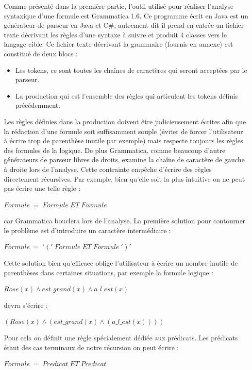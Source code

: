 Comme présenté dans la première partie, l'outil utilisé pour réaliser l'analyse syntaxique d'une formule est Grammatica 1.6. Ce programme écrit en Java est un générateur de parseur en Java et C\#, autrement dit il prend en entrée un fichier texte décrivant les règles d'une syntaxe à suivre et produit 4 classes vers le langage cible.
Ce fichier texte décrivant la grammaire (fournis en annexe) est constitué de deux blocs :
\begin{itemize}
	\item Les tokens, ce sont toutes les chaînes de caractères qui seront acceptées par le parseur.
	\item La production qui est l'ensemble des règles qui articulent les tokens définis précédemment.
\end{itemize}
Les règles définies dans la production doivent être judicieusement écrites afin que la rédaction d'une formule soit suffisamment souple (éviter de forcer l'utilisateur à écrire trop de parenthèse inutile par exemple) mais respecte toujours les règles des formules de la logique. De plus Grammatica, comme beaucoup d'autre générateurs de parseur libres de droits, examine la chaîne de caractère de gauche à droite lors de l'analyse. Cette contrainte empêche d'écrire des règles directement récursives. Par exemple, bien qu'elle soit la plus intuitive on ne peut pas écrire une telle règle :
\newline \begin{center}$Formule \; = \; Formule \; ET \; Formule$\end{center}
car Grammatica bouclera lors de l'analyse. La première solution pour contourner le problème est d'introduire un caractère intermédiaire :
\newline \begin{center}$Formule \; = \; '(' \; Formule \; ET \; Formule  \; ')'$\end{center}
Cette solution bien qu'efficace oblige l'utilisateur à écrire un nombre inutile de parenthèses dans certaines situations, par exemple la formule logique :
\newline \begin{center}$Rose(x) \land est\_grand(x) \land a\_l\_est(x)$\end{center}
devra s'écrire :
\newline \begin{center}$(Rose(x) \land (est\_grand(x) \land (a\_l\_est(x))))$\end{center}
Pour cela on définit une règle spécialement dédiée aux prédicats. Les prédicats étant des cas terminaux de notre récursion on peut écrire :
\newline \begin{center}$Formule \; = \; Predicat \; ET \; Predicat$\end{center}

